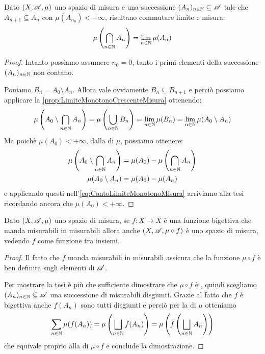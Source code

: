 \begin{corollary}\label{cor:LimiteMonotonoDecrescenteMisura}
	Dato $(X,\mathscr A,\mu)$ uno spazio di misura e una successione $(A_n)_{n\in\mathbb N}\subseteq \mathscr A$ tale che $A_{n+1}\subseteq A_n$ con $\mu(A_{n_0})<+\infty$, risultano commutare limite e misura:
	\begin{equation*}
		\mu\left(\bigcap_{n\in\mathbb N} A_n\right)=\lim_{n\in\mathbb N} \mu(A_n)
	\end{equation*}
\end{corollary}
\begin{proof}
	Intanto possiamo assumere $n_0=0$, tanto i primi elementi della successione $(A_n)_{n\in\mathbb N}$ non contano.
	
	Poniamo $B_n=A_0\setminus A_n$. Allora vale ovviamente $B_n\subseteq B_{n+1}$ e perciò possiamo applicare la \cref{prop:LimiteMonotonoCrescenteMisura} ottenendo:
	\begin{equation}\label{eq:ContoLimiteMonotonoMisura}
		\mu\left(A_0\setminus\bigcap_{n\in\mathbb N}A_n\right)=\mu\left(\bigcup_{n\in\mathbb N}B_n\right)=\lim_{n\in\mathbb N}\mu(B_n)
		=\lim_{n\in\mathbb N}\mu(A_0\setminus A_n)
	\end{equation}
	Ma poichè $\mu(A_0)<+\infty$, dalla \sigadd[ità] di $\mu$, possiamo ottenere:
	\begin{align*}
		\mu\left(A_0\setminus\bigcap_{n\in\mathbb N}A_n\right)&=\mu(A_0)-\mu\left(\bigcap_{n\in\mathbb N}A_n\right)\\
		\mu(A_0\setminus A_n)&=\mu(A_0)-\mu(A_n)
	\end{align*}
	e applicando questi nell'\cref{eq:ContoLimiteMonotonoMisura} arriviamo alla tesi ricordando ancora che $\mu(A_0)<+\infty$.
\end{proof}

\begin{proposition}\label{prop:BigettivaInduceMisura}
	Dato $(X,\mathscr A,\mu)$ uno spazio di misura, se $f:X\to X$ è una funzione bigettiva che manda misurabili in misurabili allora anche $(X,\mathscr A,\mu\circ f)$ è uno spazio di misura, vedendo $f$ come funzione tra insiemi.
\end{proposition}
\begin{proof}
	Il fatto che $f$ manda misurabili in misurabili assicura che la funzione $\mu\circ f$ è ben definita sugli elementi di $\mathscr A$.
	
	Per mostrare la tesi è più che sufficiente dimostrare che $\mu\circ f$ è \sigadd{}, quindi scegliamo $(A_n)_{n\in\mathbb N}\subseteq\mathscr A$ una successione di misurabili disgiunti.
	Grazie al fatto che $f$ è bigettiva anche $f(A_n)$ sono tutti disgiunti e perciò per la \sigadd[ità] di $\mu$ otteniamo
	\begin{equation*}
		\sum_{n\in\mathbb N}\mu(f(A_n))=\mu\left(\bigsqcup_{n\in\mathbb N}f(A_n)\right)=\mu\left(f\left(\bigsqcup_{n\in\mathbb N}A_n\right)\right)
	\end{equation*}
	che equivale proprio alla \sigadd[ità] di $\mu\circ f$ e conclude la dimostrazione.
\end{proof}




